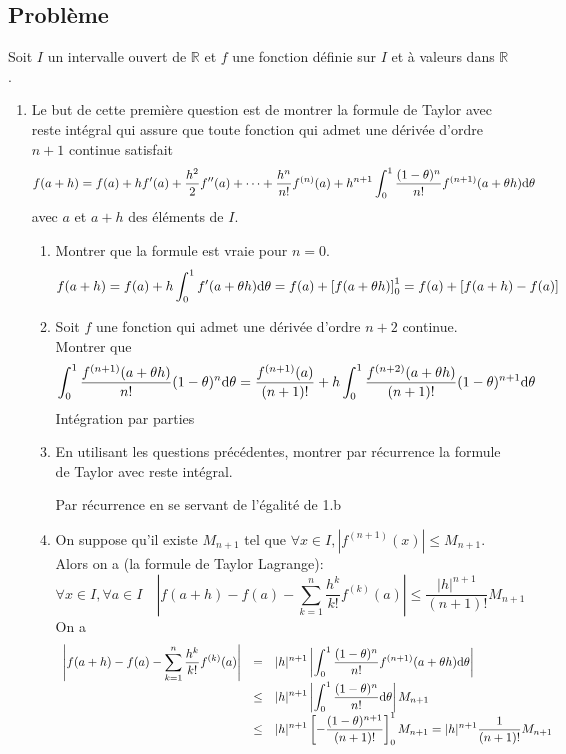 \documentclass{article}[11pt]
\def \de {{\rm d}}
\begin{document}
\subsection*{Problème}
{\color{blue}
Soit $I$ un intervalle ouvert de $\mathbb{R}$ et $f$ une fonction définie sur $I$ et à valeurs dans $\mathbb{R}$.}
\begin{enumerate}
\color{blue}
\item Le but de cette première question est de montrer la formule de Taylor avec reste intégral qui assure que toute fonction qui admet une dérivée d'ordre $n+1$ continue satisfait
\[f(a+h)=f(a)+hf'(a)+\frac{h^2}{2}f''(a)+\cdots+\frac{h^n}{n!}f^{(n)}(a)+h^{n+1}\int_0^1\frac{(1-\theta)^n}{n!}f^{(n+1)}(a+\theta h)\de \theta\]
avec $a$ et $a+h$ des éléments de $I$.
\begin{enumerate}
\item  Montrer que la formule est vraie pour $n=0$.
\color{black}
\[f(a+h)=f(a)+h\int_0^1f'(a+\theta h)\de \theta = f(a)+\left[f(a+\theta h)\right]_0^1=f(a)+\left[f(a+ h) - f(a)\right] \]
\color{blue}
\item  Soit $f$ une fonction qui admet une dérivée d'ordre $n+2$ continue. Montrer que
\[\int_0^1\frac{f^{(n+1)}(a+\theta h)}{n!}(1-\theta)^n\de \theta=\frac{f^{(n+1)}(a)}{(n+1)!}+h\int_0^1\frac{f^{(n+2)}(a+\theta h)}{(n+1)!}(1-\theta)^{n+1}\de \theta\]
\color{black}
Intégration par parties
\color{blue}
\item  En utilisant les questions précédentes, montrer par récurrence la formule de Taylor avec reste intégral.

\color{black}
Par récurrence en se servant de l'égalité de 1.b
\color{blue}
\item On suppose qu'il existe $M_{n+1}$ tel que $\forall x\in I,  |f^{(n+1)}(x)|\leq M_{n+1}$. Alors on a (la formule de Taylor Lagrange): 
$$\displaystyle{\forall x\in I,\forall a\in I} \quad\displaystyle{\left\vert f(a+h)-f(a)-\sum_{k=1}^{n}\frac{h^k}{k!}f^{(k)}(a)\right\vert\leq \frac{\vert h\vert^{n+1}}{(n+1)!}}M_{n+1}$$
\color{black}
On a
$$
\begin{array}{lcl}
\displaystyle \left\vert f(a+h)-f(a)-\sum_{k=1}^{n}\frac{h^k}{k!}f^{(k)}(a)\right\vert
 & = &
 \displaystyle  \vert h\vert^{n+1}  \left\vert  \int_0^1\frac{(1-\theta)^n}{n!}f^{(n+1)}(a+\theta h)\de \theta \right\vert  \\
  & \leq & \displaystyle   \vert h\vert^{n+1}  \left\vert  \int_0^1\frac{(1-\theta)^n}{n!}\de \theta \right\vert M_{n+1}  \\
  & \leq & \displaystyle   \vert h\vert^{n+1}  \left[  -\frac{(1-\theta)^{n+1}}{(n+1)!} \right]_0^1 M_{n+1} =\displaystyle   \vert h\vert^{n+1} \frac{1}{(n+1)!}  M_{n+1} 
\end{array}
$$





\end{enumerate}
\end{enumerate}
\end{document}
